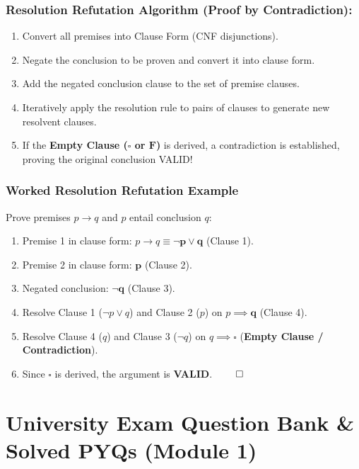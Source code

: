 \documentclass[11pt,a4paper]{article}
\begin{document}
\subsubsection*{Resolution Refutation Algorithm (Proof by Contradiction):}
\begin{enumerate}[leftmargin=1.5em]
    \item Convert all premises into Clause Form (CNF disjunctions).
    \item Negate the conclusion to be proven and convert it into clause form.
    \item Add the negated conclusion clause to the set of premise clauses.
    \item Iteratively apply the resolution rule to pairs of clauses to generate new resolvent clauses.
    \item If the \textbf{Empty Clause ($\square$ or $\mathbf{F}$)} is derived, a contradiction is established, proving the original conclusion VALID!
\end{enumerate}

\subsubsection*{Worked Resolution Refutation Example}
Prove premises $p \rightarrow q$ and $p$ entail conclusion $q$:
\begin{enumerate}[leftmargin=1.5em]
    \item Premise 1 in clause form: $p \rightarrow q \equiv \mathbf{\neg p \lor q}$ (Clause 1).
    \item Premise 2 in clause form: $\mathbf{p}$ (Clause 2).
    \item Negated conclusion: $\mathbf{\neg q}$ (Clause 3).
    \item Resolve Clause 1 ($\neg p \lor q$) and Clause 2 ($p$) on $p \implies \mathbf{q}$ (Clause 4).
    \item Resolve Clause 4 ($q$) and Clause 3 ($\neg q$) on $q \implies \mathbf{\square}$ (\textbf{Empty Clause / Contradiction}).
    \item Since $\square$ is derived, the argument is \textbf{VALID}. $\qed$
\end{enumerate}

\section{University Exam Question Bank \& Solved PYQs (Module 1)}
\end{document}

